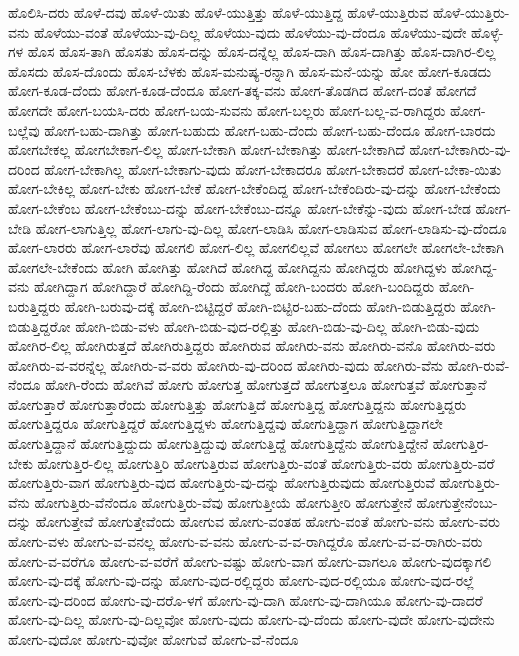 {ಹೊಲಿಸಿ-ದರು
ಹೊಳೆ-ದವು
ಹೊಳೆ-ಯಿತು
ಹೊಳೆ-ಯುತ್ತಿತ್ತು
ಹೊಳೆ-ಯುತ್ತಿದ್ದ
ಹೊಳೆ-ಯುತ್ತಿರುವ
ಹೊಳೆ-ಯುತ್ತಿರು-ವನು
ಹೊಳೆಯು-ವಂತೆ
ಹೊಳೆಯು-ವು-ದಿಲ್ಲ
ಹೊಳೆಯು-ವುದು
ಹೊಳೆಯು-ವು-ದೆಂದೂ
ಹೊಳೆಯು-ವುದೇ
ಹೊಳ್ಳೆ-ಗಳ
ಹೊಸ
ಹೊಸ-ತಾಗಿ
ಹೊಸತು
ಹೊಸ-ದನ್ನು
ಹೊಸ-ದನ್ನೆಲ್ಲ
ಹೊಸ-ದಾಗಿ
ಹೊಸ-ದಾಗಿತ್ತು
ಹೊಸ-ದಾಗಿರ-ಲಿಲ್ಲ
ಹೊಸದು
ಹೊಸ-ದೊಂದು
ಹೊಸ-ಬೆಳಕು
ಹೊಸ-ಮನುಷ್ಯ-ರನ್ನಾಗಿ
ಹೊಸ-ಮನೆ-ಯನ್ನು
ಹೋ
ಹೋಗ-ಕೂಡದು
ಹೋಗ-ಕೂಡ-ದೆಂದು
ಹೋಗ-ಕೂಡ-ದೆಂದೂ
ಹೋಗ-ತಕ್ಕ-ವನು
ಹೋಗ-ತೊಡಗಿದ
ಹೋಗ-ದಂತೆ
ಹೋಗದೆ
ಹೋಗದೇ
ಹೋಗ-ಬಯಸಿ-ದರು
ಹೋಗ-ಬಯ-ಸುವನು
ಹೋಗ-ಬಲ್ಲರು
ಹೋಗ-ಬಲ್ಲ-ವ-ರಾಗಿದ್ದರು
ಹೋಗ-ಬಲ್ಲೆವು
ಹೋಗ-ಬಹು-ದಾಗಿತ್ತು
ಹೋಗ-ಬಹುದು
ಹೋಗ-ಬಹು-ದೆಂದು
ಹೋಗ-ಬಹು-ದೆಂದೂ
ಹೋಗ-ಬಾರದು
ಹೋಗಬೇಕಲ್ಲ
ಹೋಗಬೇಕಾಗ-ಲಿಲ್ಲ
ಹೋಗ-ಬೇಕಾಗಿ
ಹೋಗ-ಬೇಕಾಗಿತ್ತು
ಹೋಗ-ಬೇಕಾಗಿದೆ
ಹೋಗ-ಬೇಕಾಗಿರು-ವು-ದರಿಂದ
ಹೋಗ-ಬೇಕಾಗಿಲ್ಲ
ಹೋಗ-ಬೇಕಾಗು-ವುದು
ಹೋಗ-ಬೇಕಾದರೂ
ಹೋಗ-ಬೇಕಾದರೆ
ಹೋಗ-ಬೇಕಾ-ಯಿತು
ಹೋಗ-ಬೇಕಿಲ್ಲ
ಹೋಗ-ಬೇಕು
ಹೋಗ-ಬೇಕೆ
ಹೋಗ-ಬೇಕೆಂದಿದ್ದ
ಹೋಗ-ಬೇಕೆಂದಿರು-ವು-ದನ್ನು
ಹೋಗ-ಬೇಕೆಂದು
ಹೋಗ-ಬೇಕೆಂಬ
ಹೋಗ-ಬೇಕೆಂಬು-ದನ್ನು
ಹೋಗ-ಬೇಕೆಂಬು-ದನ್ನೂ
ಹೋಗ-ಬೇಕೆನ್ನು-ವುದು
ಹೋಗ-ಬೇಡ
ಹೋಗ-ಬೇಡಿ
ಹೋಗ-ಲಾಗುತ್ತಿಲ್ಲ
ಹೋಗ-ಲಾಗು-ವು-ದಿಲ್ಲ
ಹೋಗ-ಲಾಡಿಸಿ
ಹೋಗ-ಲಾಡಿಸುವ
ಹೋಗ-ಲಾಡಿಸು-ವು-ದೆಂದೂ
ಹೋಗ-ಲಾರರು
ಹೋಗ-ಲಾರೆವು
ಹೋಗಲಿ
ಹೋಗ-ಲಿಲ್ಲ
ಹೋಗಲಿಲ್ಲವೆ
ಹೋಗಲು
ಹೋಗಲೇ
ಹೋಗಲೇ-ಬೇಕಾಗಿ
ಹೋಗಲೇ-ಬೇಕೆಂದು
ಹೋಗಿ
ಹೋಗಿತ್ತು
ಹೋಗಿದೆ
ಹೋಗಿದ್ದ
ಹೋಗಿದ್ದನು
ಹೋಗಿದ್ದರು
ಹೋಗಿದ್ದಳು
ಹೋಗಿದ್ದ-ವನು
ಹೋಗಿದ್ದಾಗ
ಹೋಗಿದ್ದಾರೆ
ಹೋಗಿದ್ದಿ-ರೆಂದು
ಹೋಗಿದ್ದೆ
ಹೋಗಿ-ಬಂದರು
ಹೋಗಿ-ಬಂದಿದ್ದರು
ಹೋಗಿ-ಬರುತ್ತಿದ್ದರು
ಹೋಗಿ-ಬರುವು-ದಕ್ಕೆ
ಹೋಗಿ-ಬಿಟ್ಟಿದ್ದರೆ
ಹೋಗಿ-ಬಿಟ್ಟಿರ-ಬಹು-ದೆಂದು
ಹೋಗಿ-ಬಿಡುತ್ತಿದ್ದರು
ಹೋಗಿ-ಬಿಡುತ್ತಿದ್ದರೋ
ಹೋಗಿ-ಬಿಡು-ವಳು
ಹೋಗಿ-ಬಿಡು-ವುದ-ರಲ್ಲಿತ್ತು
ಹೋಗಿ-ಬಿಡು-ವು-ದಿಲ್ಲ
ಹೋಗಿ-ಬಿಡು-ವುದು
ಹೋಗಿರ-ಲಿಲ್ಲ
ಹೋಗಿರುತ್ತದೆ
ಹೋಗಿರುತ್ತಿದ್ದರು
ಹೋಗಿರುವ
ಹೋಗಿರು-ವನು
ಹೋಗಿರು-ವನೊ
ಹೋಗಿರು-ವರು
ಹೋಗಿರು-ವ-ವರನ್ನೆಲ್ಲ
ಹೋಗಿರು-ವ-ವರು
ಹೋಗಿರು-ವು-ದರಿಂದ
ಹೋಗಿರು-ವುದು
ಹೋಗಿರು-ವೆನು
ಹೋಗಿ-ರುವೆ-ನೆಂದೂ
ಹೋಗಿ-ರೆಂದು
ಹೋಗಿವೆ
ಹೋಗು
ಹೋಗುತ್ತ
ಹೋಗುತ್ತದೆ
ಹೋಗುತ್ತಲೂ
ಹೋಗುತ್ತವೆ
ಹೋಗುತ್ತಾನೆ
ಹೋಗುತ್ತಾರೆ
ಹೋಗುತ್ತಾರೆಂದು
ಹೋಗುತ್ತಿತ್ತು
ಹೋಗುತ್ತಿದೆ
ಹೋಗುತ್ತಿದ್ದ
ಹೋಗುತ್ತಿದ್ದನು
ಹೋಗುತ್ತಿದ್ದರು
ಹೋಗುತ್ತಿದ್ದರೂ
ಹೋಗುತ್ತಿದ್ದರೆ
ಹೋಗುತ್ತಿದ್ದಳು
ಹೋಗುತ್ತಿದ್ದವು
ಹೋಗುತ್ತಿದ್ದಾಗ
ಹೋಗುತ್ತಿದ್ದಾಗಲೇ
ಹೋಗುತ್ತಿದ್ದಾನೆ
ಹೋಗುತ್ತಿದ್ದುದು
ಹೋಗುತ್ತಿದ್ದುವು
ಹೋಗುತ್ತಿದ್ದೆ
ಹೋಗುತ್ತಿದ್ದೆನು
ಹೋಗುತ್ತಿದ್ದೇನೆ
ಹೋಗುತ್ತಿರ-ಬೇಕು
ಹೋಗುತ್ತಿರ-ಲಿಲ್ಲ
ಹೋಗುತ್ತಿರಿ
ಹೋಗುತ್ತಿರುವ
ಹೋಗುತ್ತಿರು-ವಂತೆ
ಹೋಗುತ್ತಿರು-ವರು
ಹೋಗುತ್ತಿರು-ವರೆ
ಹೋಗುತ್ತಿರು-ವಾಗ
ಹೋಗುತ್ತಿರು-ವುದ
ಹೋಗುತ್ತಿರು-ವು-ದನ್ನು
ಹೋಗುತ್ತಿರುವುದು
ಹೋಗುತ್ತಿರುವೆ
ಹೋಗುತ್ತಿರು-ವೆನು
ಹೋಗುತ್ತಿರು-ವೆನೆಂದೂ
ಹೋಗುತ್ತಿರು-ವೆವು
ಹೋಗುತ್ತೀಯೆ
ಹೋಗುತ್ತೀರಿ
ಹೋಗುತ್ತೇನೆ
ಹೋಗುತ್ತೇನೆಂಬು-ದನ್ನು
ಹೋಗುತ್ತೇವೆ
ಹೋಗುತ್ತೇವೆಂದು
ಹೋಗುವ
ಹೋಗು-ವಂತಹ
ಹೋಗು-ವಂತೆ
ಹೋಗು-ವನು
ಹೋಗು-ವರು
ಹೋಗು-ವಳು
ಹೋಗು-ವ-ವನಲ್ಲ
ಹೋಗು-ವ-ವನು
ಹೋಗು-ವ-ವ-ರಾಗಿದ್ದರೊ
ಹೋಗು-ವ-ವ-ರಾಗಿರು-ವರು
ಹೋಗು-ವ-ವರೆಗೂ
ಹೋಗು-ವ-ವರೆಗೆ
ಹೋಗು-ವಷ್ಟು
ಹೋಗು-ವಾಗ
ಹೋಗು-ವಾಗಲೂ
ಹೋಗು-ವುದಕ್ಕಾಗಲಿ
ಹೋಗು-ವು-ದಕ್ಕೆ
ಹೋಗು-ವು-ದನ್ನು
ಹೋಗು-ವುದ-ರಲ್ಲಿದ್ದರು
ಹೋಗು-ವುದ-ರಲ್ಲಿಯೂ
ಹೋಗು-ವುದ-ರಲ್ಲೆ
ಹೋಗು-ವು-ದರಿಂದ
ಹೋಗು-ವು-ದರೊ-ಳಗೆ
ಹೋಗು-ವು-ದಾಗಿ
ಹೋಗು-ವು-ದಾಗಿಯೂ
ಹೋಗು-ವು-ದಾದರೆ
ಹೋಗು-ವು-ದಿಲ್ಲ
ಹೋಗು-ವು-ದಿಲ್ಲವೋ
ಹೋಗು-ವುದು
ಹೋಗು-ವು-ದೆಂದು
ಹೋಗು-ವುದೇ
ಹೋಗು-ವುದೇನು
ಹೋಗು-ವುದೋ
ಹೋಗು-ವುವೋ
ಹೋಗುವೆ
ಹೋಗು-ವೆ-ನೆಂದೂ
}
